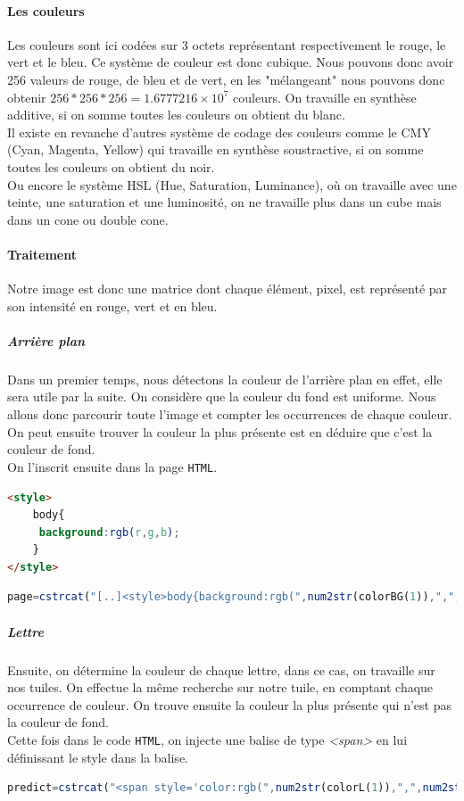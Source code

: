 \documentclass[a4paper,12pt,titlepage]{report}
\begin{document}
	\paragraph{Les couleurs} Les couleurs sont ici codées sur 3 octets représentant respectivement le rouge, le vert et le bleu. Ce système de couleur est donc cubique. Nous pouvons donc avoir 256 valeurs de rouge, de bleu et de vert, en les "mélangeant" nous pouvons donc obtenir $256*256*256=1.6777216\times 10^7$ couleurs. On travaille en synthèse additive, si on somme toutes les couleurs on obtient du blanc.\\
	Il existe en revanche d'autres système de codage des couleurs comme le CMY (Cyan, Magenta, Yellow) qui travaille en synthèse soustractive, si on somme toutes les couleurs on obtient du noir.\\ Ou encore le système HSL (Hue, Saturation, Luminance), où on travaille avec une teinte, une saturation et une luminosité, on ne travaille plus dans un cube mais dans un cone ou double cone.
	\paragraph{Traitement} Notre image est donc une matrice dont chaque élément, pixel, est représenté par son intensité en rouge, vert et en bleu. 
	\subparagraph{Arrière plan} Dans un premier temps, nous détectons la couleur de l'arrière plan en effet, elle sera utile par la suite. On considère que la couleur du fond est uniforme. Nous allons donc parcourir toute l'image et compter les occurrences de chaque couleur. On peut ensuite trouver la couleur la plus présente est en déduire que c'est la couleur de fond.  \\
	On l'inscrit ensuite dans la page \texttt{HTML}.
	\begin{lstlisting}[caption={Style pour le fond},language=HTML]
<style>
	body{
	 background:rgb(r,g,b);	
	}
</style>
\end{lstlisting}
\begin{lstlisting}[caption={Insertion de la couleur de fond dans Octave},language=Octave]
page=cstrcat("[..]<style>body{background:rgb(",num2str(colorBG(1)),",",num2str(colorBG(2)),",",num2str(colorBG(3)),");}</style>[..]");
\end{lstlisting}
	\subparagraph{Lettre} Ensuite, on détermine la couleur de chaque lettre, dans ce cas, on travaille sur nos tuiles. On effectue la même recherche sur notre tuile, en comptant chaque occurrence de couleur. On trouve ensuite la couleur la plus présente qui n'est pas la couleur de fond.\\
	Cette fois dans le code \texttt{HTML}, on injecte une balise de type \textsl{<span>} en lui définissant le style dans la balise.
	\begin{lstlisting}[caption={Insertion de la couleur de la lettre dans Octave},language=Octave]
predict=cstrcat("<span style='color:rgb(",num2str(colorL(1)),",",num2str(colorL(2)),",",num2str(colorL(3)),");'>",predict,"</span>");
\end{lstlisting}
\end{document}
